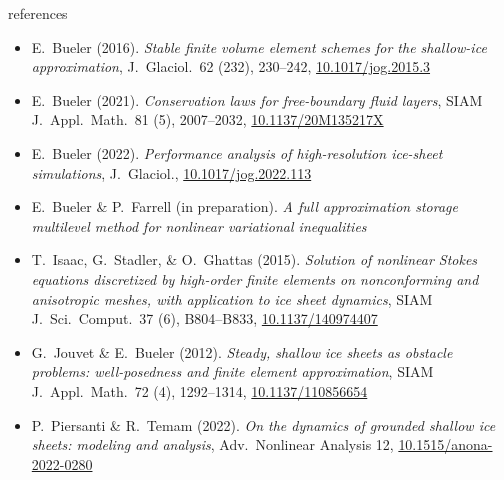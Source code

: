 \documentclass[svgnames,
               hyperref={colorlinks,citecolor=DeepPink4,linkcolor=FireBrick,urlcolor=Maroon},
               usepdftitle=false]  %
               {beamer}
\begin{document}
\begin{frame}{references}

{\scriptsize
\begin{itemize}
\item E.~Bueler (2016). \emph{Stable finite volume element schemes for the shallow-ice approximation}, J.~Glaciol.~62 (232), 230--242, \href{https://doi.org/10.1017/jog.2015.3}{10.1017/jog.2015.3}
\item E.~Bueler (2021). \emph{Conservation laws for free-boundary fluid layers}, SIAM J.~Appl.~Math.~81 (5), 2007--2032, \href{https://doi.org/10.1137/20M135217X}{10.1137/20M135217X}
\item E.~Bueler (2022). \emph{Performance analysis of high-resolution ice-sheet simulations}, J.~Glaciol., \href{https://doi.org/10.1017/jog.2022.113}{10.1017/jog.2022.113}
\item E.~Bueler \& P.~Farrell (in preparation). \emph{A full approximation storage multilevel method for nonlinear variational inequalities}
\item T.~Isaac, G.~Stadler, \& O.~Ghattas (2015). \emph{Solution of nonlinear Stokes equations discretized by high-order finite elements on nonconforming and anisotropic meshes, with application to ice sheet dynamics}, SIAM J.~Sci.~Comput.~37 (6), B804--B833, \href{https://doi.org/10.1137/140974407}{10.1137/140974407}
\item G.~Jouvet \& E.~Bueler (2012). \emph{Steady, shallow ice sheets as obstacle problems: well-posedness and finite element approximation}, SIAM J.~Appl.~Math.~72 (4), 1292--1314, \href{https://doi.org/10.1137/110856654}{10.1137/110856654}
\item P.~Piersanti \& R.~Temam (2022). \emph{On the dynamics of grounded shallow ice
sheets: modeling and analysis}, Adv.~Nonlinear Analysis 12, \href{https://doi.org/10.1515/anona-2022-0280}{10.1515/anona-2022-0280}
\end{itemize}
}
\end{frame}
\end{document}
